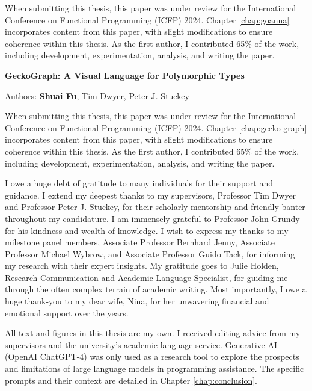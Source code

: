 \documentclass[
11pt, %
english, %
singlespacing, %
headsepline, %
]{MastersDoctoralThesis} %
\begin{document}
\begin{publications}
When submitting this thesis, this paper was under review for the International Conference on Functional Programming (ICFP) 2024. Chapter \ref{chap:goanna} incorporates content from this paper, with slight modifications to ensure coherence within this thesis. As the first author, I contributed 65\% of the work, including development, experimentation, analysis, and writing the paper.



\vspace{30px}


\noindent
\textbf{GeckoGraph: A Visual Language for Polymorphic Types}

\noindent
Authors: \textbf{Shuai Fu}, Tim Dwyer, Peter J. Stuckey
\vspace{10px}

When submitting this thesis, this paper was under review for the International Conference on Functional Programming (ICFP) 2024. Chapter \ref{chap:gecko-graph} incorporates content from this paper, with slight modifications to ensure coherence within this thesis. As the first author, I contributed 65\% of the work, including development, experimentation, analysis, and writing the paper.

\end{publications}




\begin{acknowledgements}
\addchaptertocentry{\acknowledgementname} %

I owe a huge debt of gratitude to many individuals for their support and guidance. I extend my deepest thanks to my supervisors, Professor Tim Dwyer and Professor Peter J. Stuckey, for their scholarly mentorship and friendly banter throughout my candidature. I am immensely grateful to Professor John Grundy for his kindness and wealth of knowledge. I wish to express my thanks to my milestone panel members, Associate Professor Bernhard Jenny, Associate Professor Michael Wybrow, and Associate Professor Guido Tack, for informing my research with their expert insights. My gratitude goes to Julie Holden, Research Communication and Academic Language Specialist, for guiding me through the often complex terrain of academic writing. Most importantly, I owe a huge thank-you to my dear wife, Nina, for her unwavering financial and emotional support over the years.
 
All text and figures in this thesis are my own. I received editing advice from my supervisors and the university's academic language service. Generative AI (OpenAI ChatGPT-4) was only used as a research tool to explore the prospects and limitations of large language models in programming assistance. The specific prompts and their context are detailed in Chapter \ref{chap:conclusion}.

\end{acknowledgements}
\end{document}
